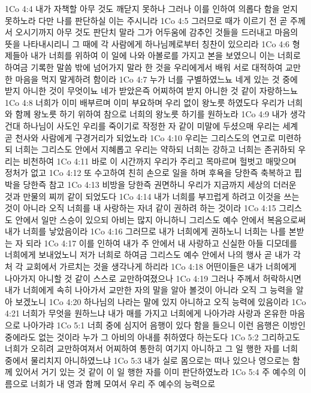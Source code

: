 1Co 4:4  내가 자책할 아무 것도 깨닫지 못하나 그러나 이를 인하여 의롭다 함을 얻지 못하노라 다만 나를 판단하실 이는 주시니라
1Co 4:5  그러므로 때가 이르기 전 곧 주께서 오시기까지 아무 것도 판단치 말라 그가 어두움에 감추인 것들을 드러내고 마음의 뜻을 나타내시리니 그 때에 각 사람에게 하나님께로부터 칭찬이 있으리라
1Co 4:6  형제들아 내가 너희를 위하여 이 일에 나와 아볼로를 가지고 본을 보였으니 이는 너희로 하여금 기록한 말씀 밖에 넘어가지 말라 한 것을 우리에게서 배워 서로 대적하여 교만한 마음을 먹지 말게하려 함이라
1Co 4:7  누가 너를 구별하였느뇨 네게 있는 것 중에 받지 아니한 것이 무엇이뇨 네가 받았은즉 어찌하여 받지 아니한 것 같이 자랑하느뇨
1Co 4:8  너희가 이미 배부르며 이미 부요하며 우리 없이 왕노릇 하였도다 우리가 너희와 함께 왕노릇 하기 위하여 참으로 너희의 왕노릇 하기를 원하노라
1Co 4:9  내가 생각건대 하나님이 사도인 우리를 죽이기로 작정한 자 같이 미말에 두셨으매 우리는 세계 곧 천사와 사람에게 구경거리가 되었노라
1Co 4:10  우리는 그리스도의 연고로 미련하되 너희는 그리스도 안에서 지혜롭고 우리는 약하되 너희는 강하고 너희는 존귀하되 우리는 비천하여
1Co 4:11  바로 이 시간까지 우리가 주리고 목마르며 헐벗고 매맞으며 정처가 없고
1Co 4:12  또 수고하여 친히 손으로 일을 하며 후욕을 당한즉 축복하고 핍박을 당한즉 참고
1Co 4:13  비방을 당한즉 권면하니 우리가 지금까지 세상의 더러운 것과 만물의 찌끼 같이 되었도다
1Co 4:14  내가 너희를 부끄럽게 하려고 이것을 쓰는 것이 아니라 오직 너희를 내 사랑하는 자녀 같이 권하려 하는 것이라
1Co 4:15  그리스도 안에서 일만 스승이 있으되 아비는 많지 아니하니 그리스도 예수 안에서 복음으로써 내가 너희를 낳았음이라
1Co 4:16  그러므로 내가 너희에게 권하노니 너희는 나를 본받는 자 되라
1Co 4:17  이를 인하여 내가 주 안에서 내 사랑하고 신실한 아들 디모데를 너희에게 보내었노니 저가 너희로 하여금 그리스도 예수 안에서 나의 행사 곧 내가 각처 각 교회에서 가르치는 것을 생각나게 하리라
1Co 4:18  어떤이들은 내가 너희에게 나아가지 아니할 것 같이 스스로 교만하여졌으나
1Co 4:19  그러나 주께서 허락하시면 내가 너희에게 속히 나아가서 교만한 자의 말을 알아 볼것이 아니라 오직 그 능력을 알아 보겠노니
1Co 4:20  하나님의 나라는 말에 있지 아니하고 오직 능력에 있음이라
1Co 4:21  너희가 무엇을 원하느냐 내가 매를 가지고 너희에게 나아가랴 사랑과 온유한 마음으로 나아가랴
1Co 5:1  너희 중에 심지어 음행이 있다 함을 들으니 이런 음행은 이방인 중에라도 없는 것이라 누가 그 아비의 아내를 취하였다 하는도다
1Co 5:2  그리하고도 너희가 오히려 교만하여져서 어찌하여 통한히 여기지 아니하고 그 일 행한 자를 너희 중에서 물리치지 아니하였느냐
1Co 5:3  내가 실로 몸으로는 떠나 있으나 영으로는 함께 있어서 거기 있는 것 같이 이 일 행한 자를 이미 판단하였노라
1Co 5:4  주 예수의 이름으로 너희가 내 영과 함께 모여서 우리 주 예수의 능력으로
